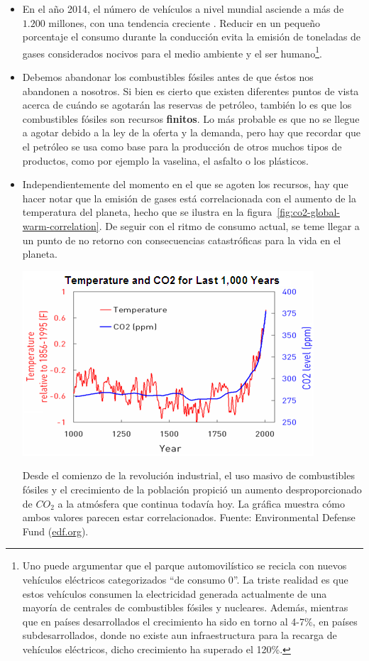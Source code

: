 \begin{itemize}
	\item En el año 2014, el número de vehículos a nivel mundial asciende a más de $1.200$ millones, con una tendencia creciente \cite{oica2014motrate}. Reducir en un pequeño porcentaje el consumo durante la conducción evita la emisión de toneladas de gases considerados nocivos para el medio ambiente y el ser humano\footnote{Uno puede argumentar que el parque automovilístico se recicla con nuevos vehículos eléctricos categorizados \enquote{de consumo 0}. La triste realidad es que estos vehículos consumen la electricidad generada actualmente de una mayoría de centrales de combustibles fósiles y nucleares. Además, mientras que en países desarrollados el crecimiento ha sido en torno al 4-7\%, en países subdesarrollados, donde no existe aun infraestructura para la recarga de vehículos eléctricos, dicho crecimiento ha superado el 120\%.}.
	\item Debemos abandonar los combustibles fósiles antes de que éstos nos abandonen a nosotros. Si bien es cierto que existen diferentes puntos de vista acerca de cuándo se agotarán las reservas de petróleo, también lo es que los combustibles fósiles son recursos \textbf{finitos}. Lo más probable es que no se llegue a agotar debido a la ley de la oferta y la demanda, pero hay que recordar que el petróleo se usa como base para la producción de otros muchos tipos de productos, como por ejemplo la vaselina, el asfalto o los plásticos.
	\item Independientemente del momento en el que se agoten los recursos, hay que hacer notar que la emisión de gases está correlacionada con el aumento de la temperatura del planeta, hecho que se ilustra en la figura~\ref{fig:co2-global-warm-correlation}. De seguir con el ritmo de consumo actual, se teme llegar a un punto de no retorno con consecuencias catastróficas para la vida en el planeta.

\begin{marginfigure}
	\centering
	\includegraphics{images/co2-global-warm-correlation}
	\caption{Desde el comienzo de la revolución industrial, el uso masivo de combustibles fósiles y el crecimiento de la población propició un aumento desproporcionado de $CO_2$ a la atmósfera que continua todavía hoy. La gráfica muestra cómo ambos valores parecen estar correlacionados. Fuente: Environmental Defense Fund (\url{edf.org}).}
	\label{fig:co2-global-warm-correlation}
\end{marginfigure}


\end{itemize}
